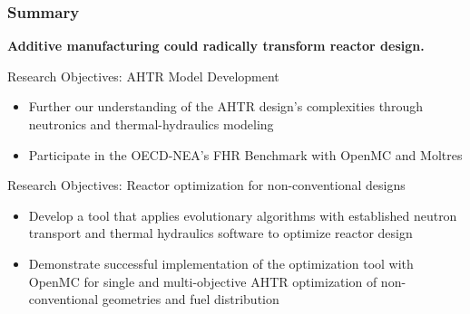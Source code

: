 \begin{frame}
    \frametitle{Summary}
    \textbf{Additive manufacturing could radically transform reactor design.}
    \begin{block}{Research Objectives: AHTR Model Development}
        \begin{itemize}
            \item Further our understanding of the AHTR design's complexities 
            through neutronics and thermal-hydraulics modeling
            \item Participate in the OECD-NEA's FHR Benchmark with 
            OpenMC and Moltres
        \end{itemize}
    \end{block}

    \begin{block}{Research Objectives: Reactor optimization for non-conventional designs}
        \begin{itemize}
            \item Develop a tool that applies evolutionary algorithms with established 
            neutron transport and thermal hydraulics software to optimize reactor 
            design
            \item Demonstrate successful implementation of the optimization tool 
            with OpenMC for single and multi-objective AHTR optimization of 
            non-conventional geometries and fuel distribution
        \end{itemize}
    \end{block}
\end{frame}
